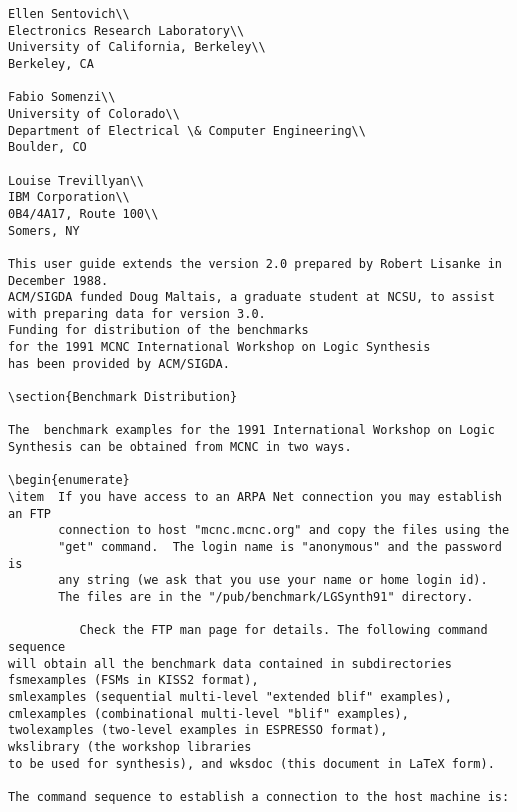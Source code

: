 {\begin{pespace}
\begin{verbatim}
Ellen Sentovich\\
Electronics Research Laboratory\\
University of California, Berkeley\\
Berkeley, CA

Fabio Somenzi\\
University of Colorado\\
Department of Electrical \& Computer Engineering\\
Boulder, CO

Louise Trevillyan\\
IBM Corporation\\
0B4/4A17, Route 100\\
Somers, NY  

This user guide extends the version 2.0 prepared by Robert Lisanke in
December 1988.
ACM/SIGDA funded Doug Maltais, a graduate student at NCSU, to assist
with preparing data for version 3.0.
Funding for distribution of the benchmarks 
for the 1991 MCNC International Workshop on Logic Synthesis
has been provided by ACM/SIGDA.

\section{Benchmark Distribution}

The  benchmark examples for the 1991 International Workshop on Logic
Synthesis can be obtained from MCNC in two ways.

\begin{enumerate}
\item  If you have access to an ARPA Net connection you may establish an FTP
       connection to host "mcnc.mcnc.org" and copy the files using the
       "get" command.  The login name is "anonymous" and the password is 
       any string (we ask that you use your name or home login id).
       The files are in the "/pub/benchmark/LGSynth91" directory.  

          Check the FTP man page for details. The following command sequence 
will obtain all the benchmark data contained in subdirectories
fsmexamples (FSMs in KISS2 format), 
smlexamples (sequential multi-level "extended blif" examples), 
cmlexamples (combinational multi-level "blif" examples), 
twolexamples (two-level examples in ESPRESSO format), 
wkslibrary (the workshop libraries
to be used for synthesis), and wksdoc (this document in LaTeX form).

The command sequence to establish a connection to the host machine is:


\end{verbatim}
\end{pespace}}
